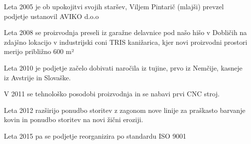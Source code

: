     Leta 2005 je ob upokojitvi svojih staršev, Viljem Pintarič (mlajši) 
    prevzel podjetje ustanovil AVIKO d.o.o

    Leta 2008 se proizvodnja preseli iz garažne delavnice pod našo hišo 
    v Dobličih na zdajšno lokacijo v industrijski coni TRIS kanižarica,
    kjer novi proizvodni prostori merijo približno 600 m²

    Leta 2010 je podjetje začelo dobivati naročila iz tujine,
    prvo iz Nemčije, kasneje iz Avstrije in Slovaške.

    V 2011 se tehnološko posodobi proizvodnja
    in se nabavi prvi CNC stroj.

    Leta 2012 razširijo ponudbo storitev z zagonom nove linije za praškasto barvanje 
    kovin in ponudbo storitev na novi žični eroziji.

    Leta 2015 pa se podjetje reorganizira po standardu
    ISO 9001

\newpage